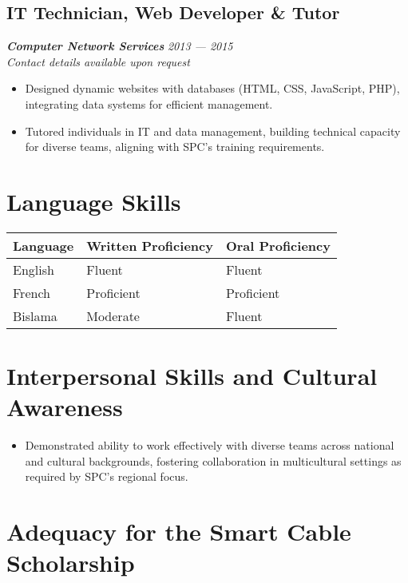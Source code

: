 \documentclass[
  letterpaper,
  DIV=11,
  numbers=noendperiod]{scrartcl}
\providecommand{\tightlist}{%
  \setlength{\itemsep}{0pt}\setlength{\parskip}{0pt}}
\begin{document}
\subsection{IT Technician, Web Developer \&
Tutor}\label{it-technician-web-developer-tutor}

\textbf{\emph{Computer Network Services}} {\emph{2013 --- 2015}}\\
\emph{Contact details available upon request}

\begin{itemize}
\tightlist
\item
  Designed dynamic websites with databases (HTML, CSS, JavaScript, PHP),
  integrating data systems for efficient management.\\
\item
  Tutored individuals in IT and data management, building technical
  capacity for diverse teams, aligning with SPC's training requirements.
\end{itemize}

\section{Language Skills}\label{language-skills}

\begin{longtable}[]{@{}lll@{}}
\toprule\noalign{}
Language & Written Proficiency & Oral Proficiency \\
\midrule\noalign{}
\endhead
\bottomrule\noalign{}
\endlastfoot
English & Fluent & Fluent \\
French & Proficient & Proficient \\
Bislama & Moderate & Fluent \\
\end{longtable}

\section{Interpersonal Skills and Cultural
Awareness}\label{interpersonal-skills-and-cultural-awareness}

\begin{itemize}
\tightlist
\item
  Demonstrated ability to work effectively with diverse teams across
  national and cultural backgrounds, fostering collaboration in
  multicultural settings as required by SPC's regional focus.
\end{itemize}

\section{Adequacy for the Smart Cable
Scholarship}\label{adequacy-for-the-smart-cable-scholarship}
\end{document}
